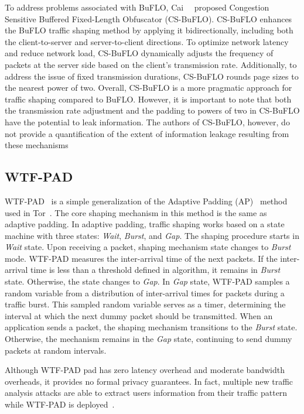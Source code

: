 To address problems associated with BuFLO, Cai~\etal~\cite{cai2014cs} proposed Congestion Sensitive Buffered Fixed-Length Obfuscator (CS-BuFLO).
CS-BuFLO enhances the BuFLO traffic shaping method by applying it bidirectionally, including both the client-to-server and server-to-client directions. 
To optimize network latency and reduce network load, CS-BuFLO dynamically adjusts the frequency of packets at the server side based on the client's transmission rate.
Additionally, to address the issue of fixed transmission durations, CS-BuFLO rounds page sizes to the nearest power of two. 
Overall, CS-BuFLO is a more pragmatic approach for traffic shaping compared to BuFLO. 
However, it is important to note that both the transmission rate adjustment and the padding to powers of two in CS-BuFLO have the potential to leak information.
The authors of CS-BuFLO, however, do not provide a quantification of the extent of information leakage resulting from these mechanisms






\subsection{WTF-PAD}\label{subsubsec:wtf-pad}
WTF-PAD~\cite{juarez2016toward} is a simple generalization of the Adaptive Padding (AP)~\cite{shmatikov2006timing} method used in Tor~\cite{dingledine2004tor}. 
The core shaping mechanism in this method is the same as adaptive padding. 
In adaptive padding, traffic shaping works based on a state machine with three states: \textit{Wait}, \textit{Burst}, and \textit{Gap}. 
The shaping procedure starts in \textit{Wait} state. 
Upon receiving a packet, shaping mechanism state changes to \textit{Burst} mode. 
WTF-PAD measures the inter-arrival time of the next packets. 
If the inter-arrival time is less than a threshold defined in algorithm, it remains in \textit{Burst} state. Otherwise, the state changes to \textit{Gap}.
In \textit{Gap} state, WTF-PAD samples a random variable from a distribution of inter-arrival times for packets during a traffic burst.
This sampled random variable serves as a timer, determining the interval at which the next dummy packet should be transmitted.
When an application sends a packet, the shaping mechanism transitions to the \textit{Burst} state. Otherwise, the mechanism remains in the \textit{Gap} state, continuing to send dummy packets at random intervals. 

Although WTF-PAD pad has zero latency overhead and moderate bandwidth overheads, it provides no formal privacy guarantees.
In fact, multiple new traffic analysis attacks are able to extract users information from their traffic pattern while WTF-PAD is deployed~\cite{sirinam2018df}.


